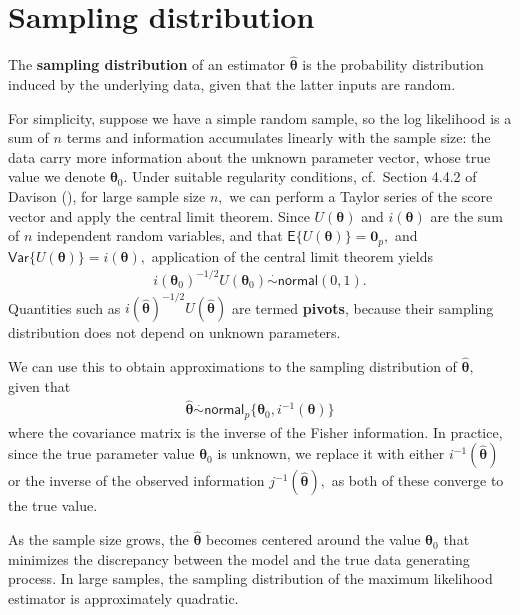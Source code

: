 \documentclass[
  11pt,
  letterpaper,
]{scrbook}
\theoremstyle{plain}
\theoremstyle{definition}
\theoremstyle{definition}
\theoremstyle{remark}
\begin{document}
\section{Sampling distribution}\label{sampling-distribution}

The \textbf{sampling distribution} of an estimator
\(\widehat{\boldsymbol{\theta}}\) is the probability distribution
induced by the underlying data, given that the latter inputs are random.

For simplicity, suppose we have a simple random sample, so the log
likelihood is a sum of \(n\) terms and information accumulates linearly
with the sample size: the data carry more information about the unknown
parameter vector, whose true value we denote \(\boldsymbol{\theta}_0.\)
Under suitable regularity conditions, cf.~Section 4.4.2 of Davison
(), for large sample size \(n,\) we can
perform a Taylor series of the score vector and apply the central limit
theorem. Since \(U(\boldsymbol{\theta})\) and \(i(\boldsymbol{\theta})\)
are the sum of \(n\) independent random variables, and that
\(\mathsf{E}\{U(\boldsymbol{\theta})\}=\boldsymbol{0}_p,\) and
\(\mathsf{Var}\{U(\boldsymbol{\theta})\}=i(\boldsymbol{\theta}),\)
application of the central limit theorem yields \begin{align*}
i(\boldsymbol{\theta}_0)^{-1/2}U(\boldsymbol{\theta}_0) \stackrel{\cdot}{\sim}\mathsf{normal}(0,1).
\end{align*} Quantities such as
\(i(\widehat{\boldsymbol{\theta}})^{-1/2}U(\widehat{\boldsymbol{\theta}})\)
are termed \textbf{pivots}, because their sampling distribution does not
depend on unknown parameters.

We can use this to obtain approximations to the sampling distribution of
\(\widehat{\boldsymbol{\theta}},\) given that \begin{align*}
\widehat{\boldsymbol{\theta}} \stackrel{\cdot}{\sim} \mathsf{normal}_p\{\boldsymbol{\theta}_0, i^{-1}(\boldsymbol{\theta})\}
\end{align*} where the covariance matrix is the inverse of the Fisher
information. In practice, since the true parameter value
\(\boldsymbol{\theta}_0\) is unknown, we replace it with either
\(i^{-1}(\widehat{\boldsymbol{\theta}})\) or the inverse of the observed
information \(j^{-1}(\widehat{\boldsymbol{\theta}}),\) as both of these
converge to the true value.

As the sample size grows, the \(\widehat{\boldsymbol{\theta}}\) becomes
centered around the value \(\boldsymbol{\theta}_0\) that minimizes the
discrepancy between the model and the true data generating process. In
large samples, the sampling distribution of the maximum likelihood
estimator is approximately quadratic.
\end{document}
